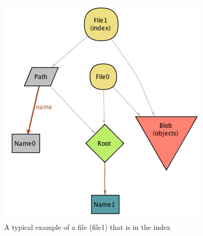 \begin{figure}[h!] 
	\caption{A typical example of a file (file1) that is in the index}
	\centering
	\includegraphics[scale=0.65]{images/image2.png}
\end{figure}
\pagebreak

